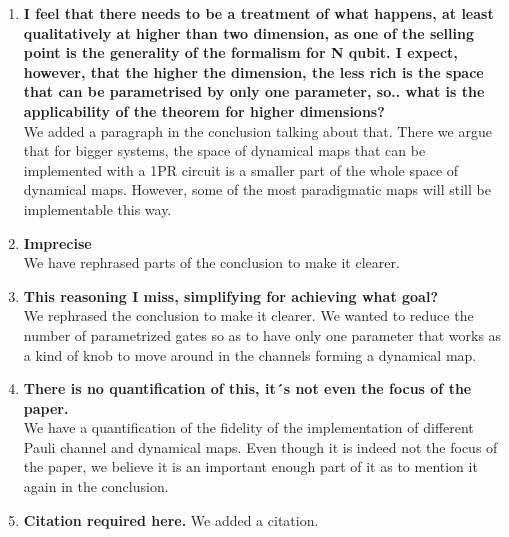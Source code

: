 \documentclass[10pt,letterpaper]{article} %
\begin{document}
\begin{enumerate}
 \item  \textbf{I feel that there needs to be a treatment of what happens, at least qualitatively at higher than two dimension, as one of the selling point is the generality of the formalism for N qubit. I expect, however, that the higher the dimension, the less rich is the space that can be parametrised by only one parameter, so.. what is the applicability of the theorem for higher dimensions?} \\
 
We added a paragraph in the conclusion talking about that.
There we argue that for bigger systems, the space of dynamical maps
that can be implemented with a 1PR circuit
is a smaller part of the whole space of dynamical maps.
However, some of the most paradigmatic maps will still be implementable this way.
  
\item \textbf{Imprecise} \\ 
 
We have rephrased parts of the conclusion to make it clearer.
 
 
\item \textbf{This reasoning I miss, simplifying for achieving what goal? } \\
 
We rephrased the conclusion to make it clearer. We wanted to reduce the number of parametrized gates
so as to have only one parameter that works as a kind of knob to move around in the channels forming
a dynamical map.
  
\item\textbf{ There is no quantification of this, it´s not even the focus of the paper.}  \\
 
We have a quantification of the fidelity of the implementation of different Pauli channel and dynamical maps.
 Even though it is indeed not the focus of the paper, we believe it
 is an important enough part of it as to mention it again in the conclusion.
 
\item \textbf{Citation required here.}
We added a citation.
\end{enumerate}
\end{document}

